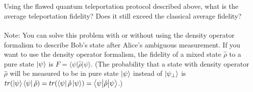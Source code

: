 \documentclass[12pt,letterpaper,boxed,cm]{hmcpset}
\newcommand{\matelem}[3]{\big\langle #1\big\vert #2\big\vert #3\big\rangle}
\begin{document}
\begin{problem}[4.]
    \\
    \\
    Using the flawed quantum teleportation protocol described above, what is the average teleportation fidelity?  Does it still exceed the classical average fidelity?  
    \\
    \\
    Note:  You can solve this problem with or without using the density operator formalism to describe Bob's state after Alice's ambiguous measurement.  If you want to use the density operator formalism, the fidelity of a mixed state $\hat{\rho}$ to a pure state $\ket{\psi}$ is $F=\matelem{\psi}{\hat{\rho}}{\psi}$.  (The probability that a state with density operator $\hat{\rho}$ will be measured to be in pure state $\ket{\psi}$ instead of $\ket{\psi_{\perp}}$ is $tr(\ket{\psi}\bra{\psi}\hat{\rho}) = tr(\bra{\psi}\hat{\rho}\ket{\psi}) = \matelem{\psi}{\hat{\rho}}{\psi}$.)
\end{problem}

\begin{solution}
    \vfill
\end{solution}
\newpage
\end{document}
